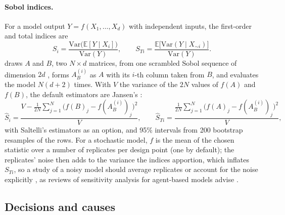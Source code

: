 \paragraph{Sobol indices.} For a model output $Y = f(X_1, \dots, X_d)$ with independent
inputs, the first-order and total indices are \citep{sobol2001global, homma1996importance}
\begin{equation}
  S_i = \frac{\mathrm{Var}\bigl(\mathbb{E}[Y \mid X_i]\bigr)}{\mathrm{Var}(Y)},
  \qquad
  S_{Ti} = \frac{\mathbb{E}\bigl[\mathrm{Var}(Y \mid X_{\sim i})\bigr]}{\mathrm{Var}(Y)}.
\end{equation}
\modelly{} draws $A$ and $B$, two $N \times d$ matrices, from one scrambled Sobol sequence of
dimension $2d$ \citep{saltelli2002making, saltelli2008global}, forms $A_B^{(i)}$ as $A$ with its $i$-th column taken from $B$, and evaluates
the model $N(d+2)$ times. With $V$ the variance of the $2N$ values of $f(A)$ and $f(B)$, the
default estimators are Jansen's \citep{jansen1999analysis, saltelli2010variance}:
\begin{equation}
  \hat S_i = \frac{V - \frac{1}{2N}\sum_{j=1}^{N}\bigl(f(B)_j - f(A_B^{(i)})_j\bigr)^2}{V},
  \qquad
  \hat S_{Ti} = \frac{\frac{1}{2N}\sum_{j=1}^{N}\bigl(f(A)_j - f(A_B^{(i)})_j\bigr)^2}{V},
  \label{eq:jansen}
\end{equation}
with Saltelli's estimators as an option, and 95\% intervals from 200 bootstrap resamples of the
rows. For a stochastic model, $f$ is the mean of the chosen statistic over a number of
replicates per design point (one by default); the replicates' noise then adds to the variance
the indices apportion, which inflates $S_{Ti}$, so a study of a noisy model should average
replicates or account for the noise explicitly \citep{hart2017efficient}, as reviews of
sensitivity analysis for agent-based models advise \citep{tenbroeke2016which}.

\subsection{Decisions and causes}
\label{sec:decide}


